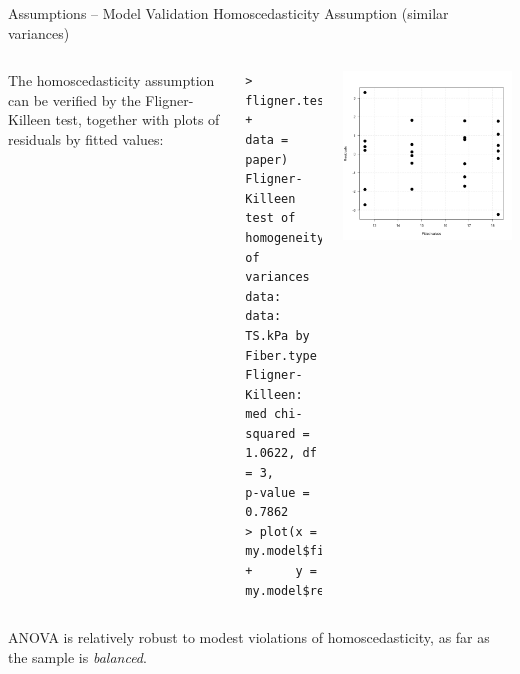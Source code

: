 %
%
\begin{frame}[fragile]
{Assumptions -- Model Validation}
{Homoscedasticity Assumption (similar variances)}
\begin{columns}
  The homoscedasticity assumption can be verified by the Fligner-Killeen test, together with plots of residuals by fitted values:

  {\smaller
\begin{verbatim}
> fligner.test(TS_kPa~Hardwood,
+              data = paper)
Fligner-Killeen test of homogeneity of
variances
data:  data:  TS.kPa by Fiber.type
Fligner-Killeen:
med chi-squared = 1.0622, df = 3,
p-value = 0.7862
> plot(x = my.model$fitted.values,
+      y = my.model$residuals)

\end{verbatim}}

  \includegraphics[width=\textwidth]{../img/papervar.png}
\end{columns}
ANOVA is relatively robust to modest violations of homoscedasticity, as far as the sample is \textit{balanced}.

\end{frame}
%
%
